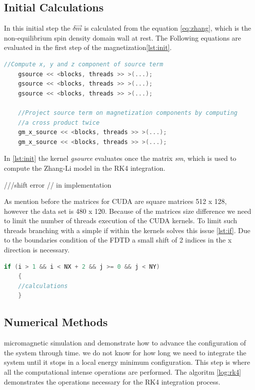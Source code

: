 \subsection{Initial Calculations}

In this initial step the $ \delta \vec{m}$ is calculated from the equation \ref{eq:zhang}, which is the non-equilibrium spin density \cite{claudio} domain wall at rest.  The Following equations  are evaluated in the first step of the magnetization\ref{lst:init}.

\begin{lstlisting}[language=C++, label={lst:init}, caption={Initial calculations}]
	//Compute x, y and z component of source term
    gsource << <blocks, threads >> >(...);
    gsource << <blocks, threads >> >(...);
    gsource << <blocks, threads >> >(...);

    //Project source term on magnetization components by computing
    //a cross product twice
    gm_x_source << <blocks, threads >> >(...);
    gm_x_source << <blocks, threads >> >(...);
\end{lstlisting}

In \ref{lst:init} the kernel \textit{gsource} evaluates once the matrix \textit{sm}, which is used to compute the Zhang-Li model in the RK4 integration. 

///shift error
// in implementation

As mention before the matrices for CUDA are square matrices 512 x 128, however the data set is 480 x 120. Because of the matrices size difference we need to limit the number of threads execution of the CUDA kernels. To limit such threads branching with a simple if within the kernels solves this issue \ref{lst:if}. Due to the boundaries condition of the FDTD a small shift of 2 indices in the x direction is necessary. 

\begin{lstlisting}[language=C++, label={lst:if}, caption={Laplacian X using global memory}]
    if (i > 1 && i < NX + 2 && j >= 0 && j < NY)
    {
    //calculations
    }
\end{lstlisting}

\subsection{Numerical Methods}

micromagnetic simulation and demonstrate how to advance the configuration of the system through time. we do not know for how long we need to integrate the system until it stops in a local energy minimum configuration.
This step is where all the computational intense operations are performed. The algoritm \ref{log:rk4} demonstrates the operations necessary for the RK4 integration process.

